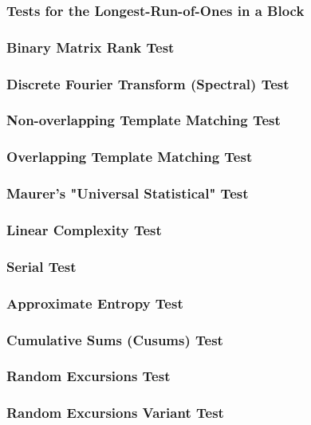 \subsubsection{Tests for the Longest-Run-of-Ones in a Block}
\subsubsection{Binary Matrix Rank Test}
\subsubsection{Discrete Fourier Transform (Spectral) Test}
\subsubsection{Non-overlapping Template Matching Test}
\subsubsection{Overlapping Template Matching Test}
\subsubsection{Maurer's "Universal Statistical" Test}
\subsubsection{Linear Complexity Test}
\subsubsection{Serial Test}
\subsubsection{Approximate Entropy Test}
\subsubsection{Cumulative Sums (Cusums) Test}
\subsubsection{Random Excursions Test}
\subsubsection{Random Excursions Variant Test}




